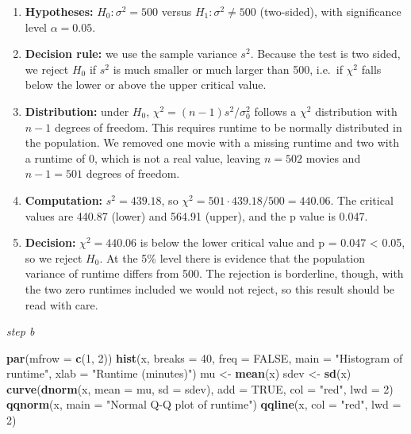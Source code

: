 \documentclass[
]{article}
\newenvironment{Shaded}{\begin{snugshade}}{\end{snugshade}}
\newcommand{\AttributeTok}[1]{\textcolor[rgb]{0.13,0.29,0.53}{#1}}
\newcommand{\ConstantTok}[1]{\textcolor[rgb]{0.56,0.35,0.01}{#1}}
\newcommand{\DecValTok}[1]{\textcolor[rgb]{0.00,0.00,0.81}{#1}}
\newcommand{\FunctionTok}[1]{\textcolor[rgb]{0.13,0.29,0.53}{\textbf{#1}}}
\newcommand{\NormalTok}[1]{#1}
\newcommand{\OtherTok}[1]{\textcolor[rgb]{0.56,0.35,0.01}{#1}}
\newcommand{\StringTok}[1]{\textcolor[rgb]{0.31,0.60,0.02}{#1}}
\providecommand{\tightlist}{%
  \setlength{\itemsep}{0pt}\setlength{\parskip}{0pt}}
\begin{document}
\begin{enumerate}
\def\labelenumi{\arabic{enumi}.}
\tightlist
\item
  \textbf{Hypotheses:} \(H_0: \sigma^2 = 500\) versus
  \(H_1: \sigma^2 \neq 500\) (two-sided), with significance level
  \(\alpha = 0.05\).
\item
  \textbf{Decision rule:} we use the sample variance \(s^2\). Because
  the test is two sided, we reject \(H_0\) if \(s^2\) is much smaller or
  much larger than 500, i.e.~if \(\chi^2\) falls below the lower or
  above the upper critical value.
\item
  \textbf{Distribution:} under \(H_0\), \(\chi^2 = (n-1)s^2/\sigma_0^2\)
  follows a \(\chi^2\) distribution with \(n-1\) degrees of freedom.
  This requires runtime to be normally distributed in the population. We
  removed one movie with a missing runtime and two with a runtime of 0,
  which is not a real value, leaving \(n = 502\) movies and
  \(n-1 = 501\) degrees of freedom.
\item
  \textbf{Computation:} \(s^2 = 439.18\), so
  \(\chi^2 = 501 \cdot 439.18/500 = 440.06\). The critical values are
  440.87 (lower) and 564.91 (upper), and the p value is 0.047.
\item
  \textbf{Decision:} \(\chi^2 = 440.06\) is below the lower critical
  value and p = 0.047 \textless{} 0.05, so we reject \(H_0\). At the 5\%
  level there is evidence that the population variance of runtime
  differs from 500. The rejection is borderline, though, with the two
  zero runtimes included we would not reject, so this result should be
  read with care.
\end{enumerate}

\emph{step b}

\begin{Shaded}
\begin{Highlighting}[]
\FunctionTok{par}\NormalTok{(}\AttributeTok{mfrow =} \FunctionTok{c}\NormalTok{(}\DecValTok{1}\NormalTok{, }\DecValTok{2}\NormalTok{))}
\FunctionTok{hist}\NormalTok{(x, }\AttributeTok{breaks =} \DecValTok{40}\NormalTok{, }\AttributeTok{freq =} \ConstantTok{FALSE}\NormalTok{, }\AttributeTok{main =} \StringTok{"Histogram of runtime"}\NormalTok{,}
     \AttributeTok{xlab =} \StringTok{"Runtime (minutes)"}\NormalTok{)}
\NormalTok{mu   }\OtherTok{\textless{}{-}} \FunctionTok{mean}\NormalTok{(x)}
\NormalTok{sdev }\OtherTok{\textless{}{-}} \FunctionTok{sd}\NormalTok{(x)}
\FunctionTok{curve}\NormalTok{(}\FunctionTok{dnorm}\NormalTok{(x, }\AttributeTok{mean =}\NormalTok{ mu, }\AttributeTok{sd =}\NormalTok{ sdev), }\AttributeTok{add =} \ConstantTok{TRUE}\NormalTok{, }\AttributeTok{col =} \StringTok{"red"}\NormalTok{, }\AttributeTok{lwd =} \DecValTok{2}\NormalTok{)}
\FunctionTok{qqnorm}\NormalTok{(x, }\AttributeTok{main =} \StringTok{"Normal Q{-}Q plot of runtime"}\NormalTok{)}
\FunctionTok{qqline}\NormalTok{(x, }\AttributeTok{col =} \StringTok{"red"}\NormalTok{, }\AttributeTok{lwd =} \DecValTok{2}\NormalTok{)}
\end{Highlighting}
\end{Shaded}
\end{document}
